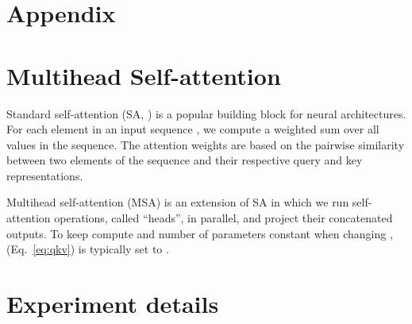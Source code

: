 \documentclass{article} \usepackage{iclr2021_conference,times}
\begin{document}



\newpage
\appendix
\section*{Appendix}

\section{Multihead Self-attention}
\label{sec:self_attention}
Standard  self-attention (SA, \citet{vaswani2017}) is a popular building block for neural architectures. For each element in an input sequence , we compute a weighted sum over all values  in the sequence. The attention weights  are based on the pairwise similarity between two elements of the sequence and their respective query  and key  representations.


Multihead self-attention (MSA) is an extension of SA in which we run  self-attention operations, called ``heads'', in parallel, and project their concatenated outputs. To keep compute and number of parameters constant when changing ,  (Eq.~\ref{eq:qkv}) is typically set to .


\section{Experiment details}
\end{document}
